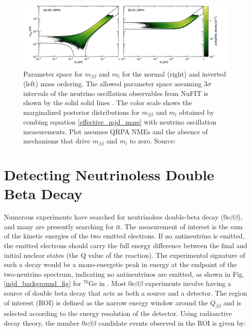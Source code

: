 \begin{figure}[!htb]
\centering
\includegraphics[trim={0.6cm 0cm 1cm 0cm},clip,width=\linewidth]
{ch1/figs/benato_posterior.png}
\caption{Parameter space for $m_{\beta\beta}$ and $m_l$ for the normal (right) and inverted (left) mass ordering. The allowed parameter space assuming $3\sigma$ intervals of the neutrino oscillation observables from NuFIT is shown by the solid solid lines \cite{nufit}. The color scale shows the marginalized posterior distributions for $m_{\beta\beta}$ and $m_l$ obtained by combing equation \ref{effective_mjd_mass} with neutrino
oscillation measurements. Plot assumes QRPA NMEs and the absence of mechanisms that drive $m_{\beta\beta}$ and $m_l$ to zero. Source: \cite{PhysRevD.96.053001}}
\label{majorana_mass}
\end{figure}


\section{Detecting Neutrinoless Double Beta Decay}
Numerous experiments have searched for neutrinoless double-beta decay ($0\nu\beta\beta$), and many are presently searching for it. The measurement of interest is the sum of the kinetic energies of the two emitted electrons. If no antineutrino is emitted, the emitted electrons should carry the full energy difference between the final and initial nuclear states (the Q value of the reaction). The experimental signature of such a decay would be a mono-energetic peak in energy at the endpoint of the two-neutrino spectrum, indicating no antineutrinos are emitted, as shown in Fig. \ref{mjd_background_fig} for ${}^{76}\mathrm{Ge}$ in {\MJD}. Most $0\nu\beta\beta$ experiments involve having a source of double beta decay that acts as both a source and a detector. The region of interest (ROI) is defined as the narrow energy window around the $Q_{\beta\beta}$ and is selected according to the energy resolution of the detector. Using radioactive decay theory, the number $0\nu\beta\beta$ candidate events observed in the ROI is given by: %

